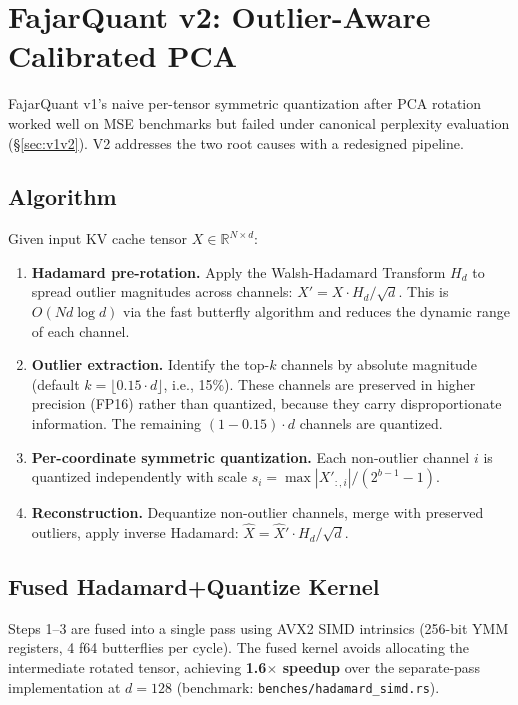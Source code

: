 \documentclass{article}
\begin{document}
\section{FajarQuant v2: Outlier-Aware Calibrated PCA}
\label{sec:fqv2}

FajarQuant v1's naive per-tensor symmetric quantization after PCA
rotation worked well on MSE benchmarks but failed under canonical
perplexity evaluation (\S\ref{sec:v1v2}). V2 addresses the two root
causes with a redesigned pipeline.

\subsection{Algorithm}

Given input KV cache tensor $X \in \mathbb{R}^{N \times d}$:

\begin{enumerate}[nosep]
\item \textbf{Hadamard pre-rotation.} Apply the Walsh-Hadamard
      Transform $H_d$ to spread outlier magnitudes across channels:
      $X' = X \cdot H_d / \sqrt{d}$. This is $O(Nd\log d)$ via the
      fast butterfly algorithm and reduces the dynamic range of each
      channel.
\item \textbf{Outlier extraction.} Identify the top-$k$ channels by
      absolute magnitude (default $k = \lfloor 0.15 \cdot d \rfloor$,
      i.e., 15\%). These channels are preserved in higher precision
      (FP16) rather than quantized, because they carry disproportionate
      information. The remaining $(1{-}0.15) \cdot d$ channels are
      quantized.
\item \textbf{Per-coordinate symmetric quantization.} Each non-outlier
      channel $i$ is quantized independently with scale
      $s_i = \max|X'_{:,i}| / (2^{b-1} - 1)$.
\item \textbf{Reconstruction.} Dequantize non-outlier channels, merge
      with preserved outliers, apply inverse Hadamard:
      $\hat{X} = \hat{X}' \cdot H_d / \sqrt{d}$.
\end{enumerate}

\subsection{Fused Hadamard+Quantize Kernel}

Steps 1--3 are fused into a single pass using AVX2 SIMD intrinsics
(256-bit YMM registers, 4 f64 butterflies per cycle). The fused
kernel avoids allocating the intermediate rotated tensor, achieving
\textbf{1.6$\times$ speedup} over the separate-pass implementation
at $d{=}128$ (benchmark: \texttt{benches/hadamard\_simd.rs}).
\end{document}
